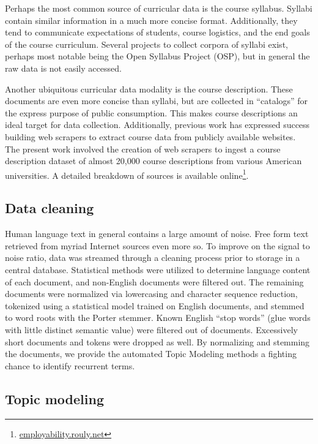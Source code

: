 Perhaps the most common source of curricular data is the course syllabus.
Syllabi contain similar information in a much more concise format.
Additionally, they tend to communicate expectations of students, course logistics, and the end goals of the course curriculum.
Several projects to collect corpora of syllabi exist, perhaps most notable being the Open Syllabus Project (OSP), but in general the raw data is not easily accessed.

Another ubiquitous curricular data modality is the course description.
These documents are even more concise than syllabi, but are collected in ``catalogs'' for the express purpose of public consumption.
This makes course descriptions an ideal target for data collection.
Additionally, previous work has expressed success building web scrapers to extract course data from publicly available websites.~\cite{rouly2015}
The present work involved the creation of web scrapers to ingest a course description dataset of almost 20,000 course descriptions from various American universities.
A detailed breakdown of sources is available online\footnote{\href{https://employability.rouly.net}{employability.rouly.net}}.

\subsection{Data cleaning}

Human language text in general contains a large amount of noise.
Free form text retrieved from myriad Internet sources even more so.
To improve on the signal to noise ratio, data was streamed through a cleaning process prior to storage in a central database.
Statistical methods were utilized to determine language content of each document, and non-English documents were filtered out.
The remaining documents were normalized via lowercasing and character sequence reduction, tokenized using a statistical model trained on English documents, and stemmed to word roots with the Porter stemmer.
Known English ``stop words'' (glue words with little distinct semantic value) were filtered out of documents.
Excessively short documents and tokens were dropped as well.
By normalizing and stemming the documents, we provide the automated Topic Modeling methods a fighting chance to identify recurrent terms.

\subsection{Topic modeling}

